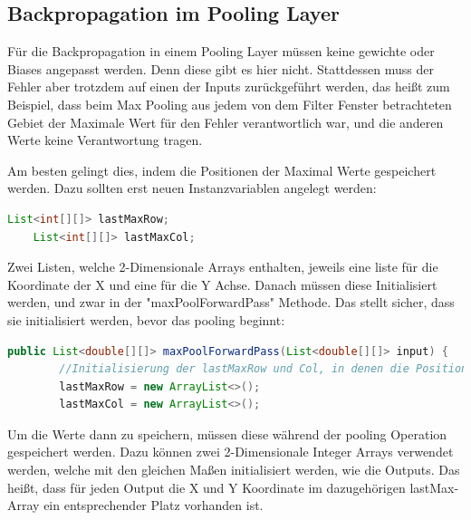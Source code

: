 \documentclass[12pt]{article}
\begin{document}
\subsection{Backpropagation im Pooling Layer}
Für die Backpropagation in einem Pooling Layer müssen keine gewichte oder Biases angepasst werden. Denn diese gibt es hier nicht. Stattdessen muss der Fehler aber trotzdem auf einen der Inputs zurückgeführt werden, das heißt zum Beispiel, dass beim Max Pooling aus jedem von dem Filter Fenster betrachteten Gebiet der Maximale Wert für den Fehler verantwortlich war, und die anderen Werte keine Verantwortung tragen. 


Am besten gelingt dies, indem die Positionen der Maximal Werte gespeichert werden.
Dazu sollten erst neuen Instanzvariablen angelegt werden:


\begin{lstlisting}[language=Java]
    List<int[][]> lastMaxRow;
    List<int[][]> lastMaxCol; 
\end{lstlisting}

Zwei Listen, welche 2-Dimensionale Arrays enthalten, jeweils eine liste für die Koordinate der X und eine für die Y Achse.
Danach müssen diese Initialisiert werden, und zwar in der "maxPoolForwardPass" Methode. Das stellt sicher, dass sie initialisiert werden, bevor das pooling beginnt:

\begin{lstlisting}[language=Java]
    public List<double[][]> maxPoolForwardPass(List<double[][]> input) {
        //Initialisierung der lastMaxRow und Col, in denen die Position der Maximalen Werte gespeichert werden
        lastMaxRow = new ArrayList<>();
        lastMaxCol = new ArrayList<>();
\end{lstlisting}

Um die Werte dann zu speichern, müssen diese während der pooling Operation gespeichert werden.
Dazu können zwei 2-Dimensionale Integer Arrays verwendet werden, welche mit den gleichen Maßen initialisiert werden, wie die Outputs. Das heißt, dass für jeden Output die X und Y Koordinate im dazugehörigen lastMax-Array ein entsprechender Platz vorhanden ist.
\end{document}

